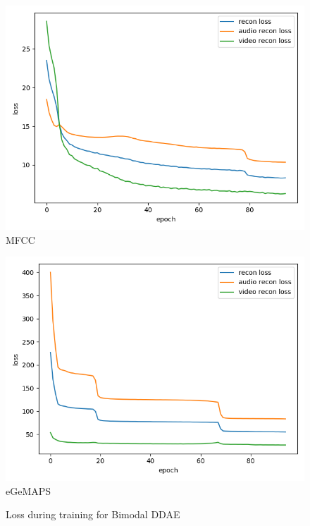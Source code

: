 \begin{figure}
    \centering
    \small
    \begin{minipage}[c]{0.48\linewidth}
    \centering
    \includegraphics[width=\textwidth]{images/results/bimodal_aligned_mfcc_hidden040_batch1024_epoch100_noise01.png} \\
    MFCC
    \end{minipage}
    \begin{minipage}[c]{0.48\linewidth}
    \centering
    \includegraphics[width=\textwidth]{images/results/bimodal_aligned_egemaps_hidden050_batch1024_epoch100_noise01.png} \\
    eGeMAPS
    \end{minipage}
    \caption{Loss during training for Bimodal DDAE}
    \label{fig:loss_bimodal}
\end{figure}

